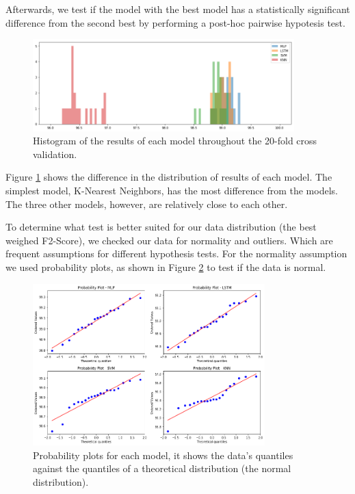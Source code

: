 Afterwards, we test if the model with the best model has a statistically significant difference from the second best by performing a post-hoc pairwise hypotesis test.

\begin{figure}[!ht]
    \centering
    \includegraphics[width=0.9\textwidth]{img/results/histogram.png}
    \caption{Histogram of the results of each model throughout the 20-fold cross validation.}
    \label{fig:results-histogram}
\end{figure}

Figure \ref{fig:results-histogram} shows the difference in the distribution of results of each model. The simplest model, K-Nearest Neighbors, has the most difference from the models. The three other models, however, are relatively close to each other.

To determine what test is better suited for our data distribution (the best weighed F2-Score), we checked our data for normality and outliers. Which are frequent assumptions for different hypothesis tests.
For the normality assumption we used probability plots, as shown in Figure \ref{fig:prob-plots} to test if the data is normal.

\begin{figure}[!ht]
    \centering
    \includegraphics[width=0.8\textwidth]{img/results/pp-plot.png}
    \caption{Probability plots for each model, it shows the data's quantiles against the quantiles of a theoretical distribution (the normal distribution).}
    \label{fig:prob-plots}
\end{figure}

